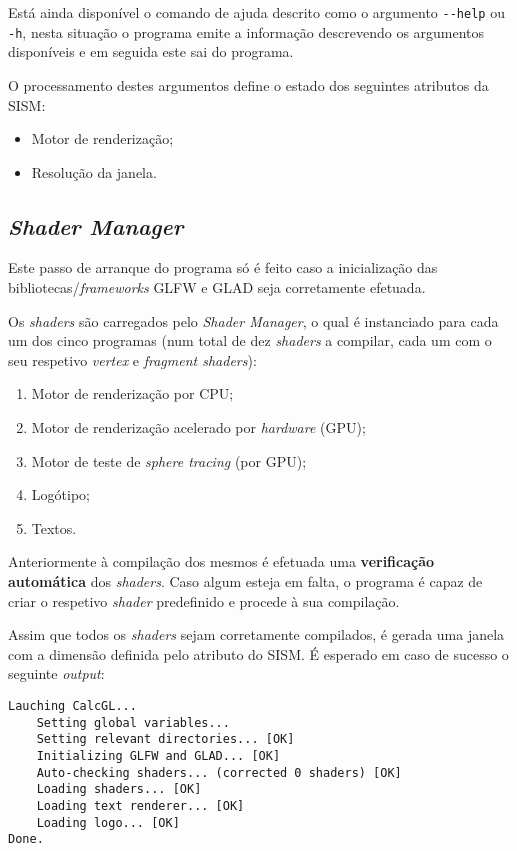 Está ainda disponível o comando de ajuda descrito como o argumento \verb|--help| ou \verb|-h|, nesta situação o programa emite a informação descrevendo os argumentos disponíveis e em seguida este sai do programa.

O processamento destes argumentos define o estado dos seguintes atributos da \ac{SISM}:
\begin{itemize}[nosep]
    \item Motor de renderização;
    \item Resolução da janela.
\end{itemize}


\subsection{\textit{Shader Manager}}
\label{ssec::impl:estrutura:shaders}

Este passo de arranque do programa só é feito caso a inicialização das bibliotecas/\textit{frameworks} \ac{GLFW} e \ac{GLAD} seja corretamente efetuada.

Os \textit{shaders} são carregados pelo \textit{Shader Manager}, o qual é instanciado para cada um dos cinco programas (num total de dez \textit{shaders} a compilar, cada um com o seu respetivo \textit{vertex} e \textit{fragment shaders}):

\begin{enumerate}[nosep]
	\item Motor de renderização por \acs{CPU};
	\item Motor de renderização acelerado por \textit{hardware} (\acs{GPU});
	\item Motor de teste de \textit{sphere tracing} (por \acs{GPU});
	\item Logótipo;
	\item Textos.
\end{enumerate}

Anteriormente à compilação dos mesmos é efetuada uma \textbf{verificação automática} dos \textit{shaders}. Caso algum esteja em falta, o programa é capaz de criar o respetivo \textit{shader} predefinido e procede à sua compilação.

Assim que todos os \textit{shaders} sejam corretamente compilados, é gerada uma janela com a dimensão definida pelo atributo do \ac{SISM}. É esperado em caso de sucesso o seguinte \textit{output}:

\begin{verbatim}
Lauching CalcGL...
    Setting global variables...     
    Setting relevant directories... [OK]
    Initializing GLFW and GLAD... [OK]
    Auto-checking shaders... (corrected 0 shaders) [OK]
    Loading shaders... [OK]
    Loading text renderer... [OK]
    Loading logo... [OK]
Done.
\end{verbatim}


